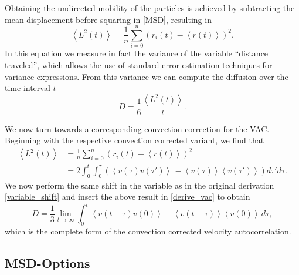 Obtaining the undirected mobility of the particles is achieved by subtracting the mean displacement before squaring in \eqref{MSD}, resulting in
\begin{equation}
 \left<L^2(t)\right> =\frac{1}{n} \sum_{i=0}^{n} \left(r_i(t) - \left<r(t)\right>\right)^{2}. \nonumber
\end{equation}
In this equation we measure in fact the variance of the variable ``distance traveled'', which allows the use of standard error estimation techniques for variance expressions. From this variance we can compute the diffusion over the time interval $t$
\begin{equation}
 D = \frac{1}{6} \frac{\left<L^2(t)\right>}{t}. \nonumber
\end{equation}

We now turn towards a corresponding convection correction for the VAC. Beginning with the respective convection corrected variant, we find that
\begin{align}
 \left< L^2(t)\right> & = \frac{1}{n} \sum_{i=0}^{n} (r_i(t) - \left<r(t)\right>)^{2} \nonumber\\
&=  2\int_0^t \int_0^{\tau}  \left( \left< v(\tau)v(\tau')\right> \,  - \left< v(\tau) \right>\left< v(\tau') \right> \right) d\tau' d\tau. \nonumber
\end{align}
We now perform the same shift in the variable as in the original derivation \eqref{variable_shift} and insert the above result in \ref{derive_vac} to obtain
\begin{equation}
\label{corrected_vac}
 D = \frac{1}{3} \lim_{t\rightarrow \infty} \int_0^t \left< v(t-\tau) v(0) \right> - \left< v(t-\tau) \right>\left< v(0) \right> \, d\tau,
\end{equation}
which is the complete form of the convection corrected velocity autocorrelation.

\subsection{MSD-Options}

